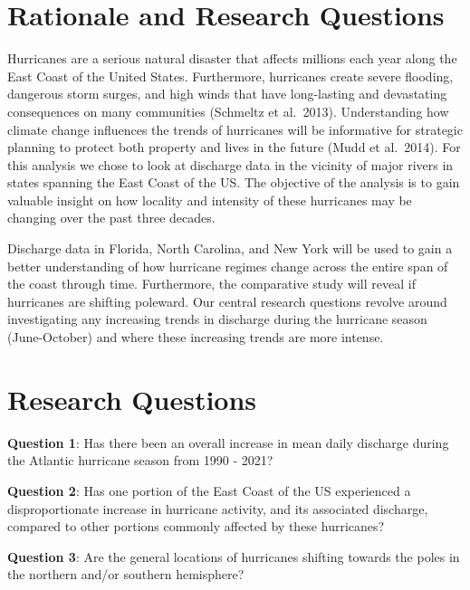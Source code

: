 \documentclass[
  12pt,
]{article}
\begin{document}
\newpage
\listoffigures

\hypertarget{rationale-and-research-questions}{%
\section{Rationale and Research
Questions}\label{rationale-and-research-questions}}

Hurricanes are a serious natural disaster that affects millions each
year along the East Coast of the United States. Furthermore, hurricanes
create severe flooding, dangerous storm surges, and high winds that have
long-lasting and devastating consequences on many communities (Schmeltz
et al.~2013). Understanding how climate change influences the trends of
hurricanes will be informative for strategic planning to protect both
property and lives in the future (Mudd et al.~2014). For this analysis
we chose to look at discharge data in the vicinity of major rivers in
states spanning the East Coast of the US. The objective of the analysis
is to gain valuable insight on how locality and intensity of these
hurricanes may be changing over the past three decades.

Discharge data in Florida, North Carolina, and New York will be used to
gain a better understanding of how hurricane regimes change across the
entire span of the coast through time. Furthermore, the comparative
study will reveal if hurricanes are shifting poleward. Our central
research questions revolve around investigating any increasing trends in
discharge during the hurricane season (June-October) and where these
increasing trends are more intense.

\hypertarget{research-questions}{%
\section{Research Questions}\label{research-questions}}

\textbf{Question 1}: Has there been an overall increase in mean daily
discharge during the Atlantic hurricane season from 1990 - 2021?

\textbf{Question 2}: Has one portion of the East Coast of the US
experienced a disproportionate increase in hurricane activity, and its
associated discharge, compared to other portions commonly affected by
these hurricanes?

\textbf{Question 3}: Are the general locations of hurricanes shifting
towards the poles in the northern and/or southern hemisphere?
\end{document}
